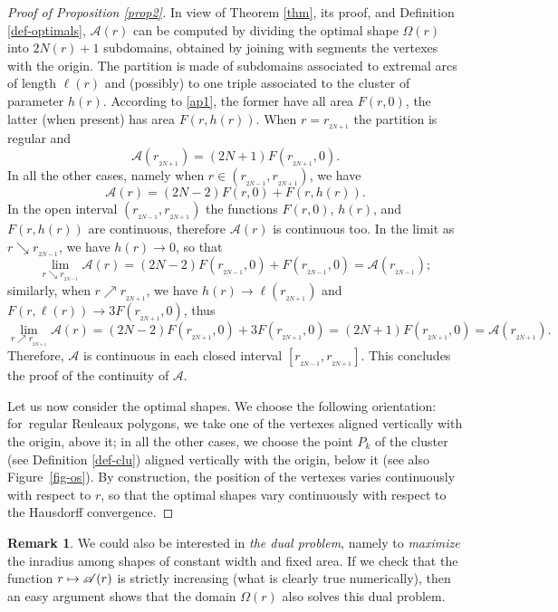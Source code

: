 \documentclass[11pt]{article}
\numberwithin{equation}{section}
\let\mathcal\mathscr
\newcommand\mto{\mathchoice{\longmapsto}{\mapsto}{\mapsto}{\mapsto}}
\theoremstyle{plain}
\theoremstyle{definition}
\newtheorem{remark}[theorem]{Remark}
\newcommand\A{\mathcal A}
\renewcommand\r{r_{_{2N+1}}}
\begin{document}
\begin{proof}[Proof of Proposition \ref{prop2}] In view of Theorem \ref{thm}, its proof, and Definition \ref{def-optimals}, $\A(r)$ can be computed by dividing the optimal shape $\Omega(r)$ into $2N(r)+1$ subdomains, obtained by joining with segments the vertexes with the origin. The partition is made of subdomains associated to extremal arcs of length $\ell(r)$ and (possibly) to one triple associated to the cluster of parameter $h(r)$. According to \eqref{ap1}, the former have all area $F(r,0)$, the latter (when present) has area $F(r,h(r))$.
When $r=\r$ the partition is regular and
\[
\A(\r) = (2N+1)F(\r,0).
\]
In all the other cases, namely when $r\in (r_{_{2N-1}},\r)$, we have
\[
\A(r)=(2N-2)F(r,0) + F(r,h(r)).
\]
In the open interval $(r_{_{2N-1}}, \r)$ the functions $F(r,0)$, $h(r)$, and $F(r,h(r))$ are continuous, therefore $\A(r)$ is continuous too. In the limit as $r \searrow r_{_{2N-1}}$, we have $h(r)\to 0$, so that
\[
\lim_{r\searrow r_{_{2N-1}}}\A(r)= (2N-2)F(r_{_{2N-1}},0) + F(r_{_{2N-1}},0) = \A(r_{_{2N-1}});
\]
similarly, when $r\nearrow \r$, we have $h(r)\to\ell(\r)$ and $F(r,\ell(r))\to 3 F(\r,0)$, thus
\[
\lim_{r\nearrow \r}\A(r)=(2N-2)F(\r,0) + 3F(\r,0)=(2N+1)F(\r,0) = \A(\r).
\]
Therefore, $\A$ is continuous in each closed interval $[r_{_{2N-1}},\r]$. This concludes the proof of the continuity of $\A$.

Let us now consider the optimal shapes. We choose the following orientation: for~regular Reuleaux polygons, we take one of the vertexes aligned vertically with the origin, above it; in all the other cases, we choose the point $P_k$ of the cluster (see Definition \ref{def-clu}) aligned vertically with the origin, below it (see also Figure~\ref{fig-os}). By construction, the position of the vertexes varies continuously with respect to $r$, so that the optimal shapes vary continuously with respect to the Hausdorff convergence.
\end{proof}

\begin{remark}
We could also be interested in \emph{the dual problem}, namely to \emph{maximize} the inradius among shapes of constant width and fixed area. If we check that the function $r\mto \A(r)$ is strictly increasing
(what is clearly true numerically), then an easy argument shows that the domain $\Omega(r)$ also
solves this dual problem.
\end{remark}


\end{document}
